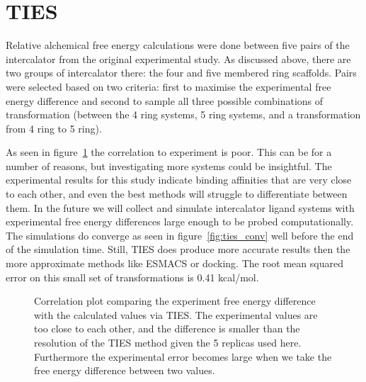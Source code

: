 \section{TIES}

Relative alchemical free energy calculations were done between five pairs of the intercalator from the original experimental study. As discussed above, there are two groups of intercalator there: the four and five membered ring scaffolds. Pairs were selected based on two criteria: first to maximise the experimental free energy difference and second to sample all three possible combinations of transformation (between the 4 ring systems, 5 ring systems, and a transformation from 4 ring to 5 ring). 

As seen in figure~\ref{fig:ties} the correlation to experiment is poor. This can be for a number of reasons, but investigating more systems could be insightful. The experimental results for this study indicate binding affinities that are very close to each other, and even the best methods will struggle to differentiate between them. In the future we will collect and simulate intercalator ligand systems with experimental free energy differences large enough to be probed computationally. The simulations do converge as seen in figure~\ref{fig:ties_conv} well before the end of the simulation time. Still, TIES does produce more accurate results then the more approximate methods like ESMACS or docking. The root mean squared error on this small set of transformations is 0.41 kcal/mol.

\begin{figure}
  \centering
  
  \caption{Correlation plot comparing the experiment free energy difference with the calculated values via TIES. The experimental values are too close to each other, and the difference is smaller than the resolution of the TIES method given the 5 replicas used here. Furthermore the experimental error becomes large when we take the free energy difference between two values.}
  \label{fig:ties}
\end{figure}

